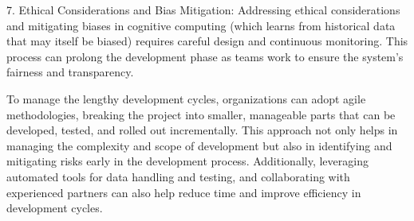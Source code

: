 \documentclass{article}
\begin{document}
7. Ethical Considerations and Bias Mitigation: Addressing ethical considerations and mitigating biases in cognitive computing (which learns from historical data that may itself be biased) requires careful design and continuous monitoring. This process can prolong the development phase as teams work to ensure the system’s fairness and transparency.

To manage the lengthy development cycles, organizations can adopt agile methodologies, breaking the project into smaller, manageable parts that can be developed, tested, and rolled out incrementally. This approach not only helps in managing the complexity and scope of development but also in identifying and mitigating risks early in the development process. Additionally, leveraging automated tools for data handling and testing, and collaborating with experienced partners can also help reduce time and improve efficiency in development cycles.
\end{document}
